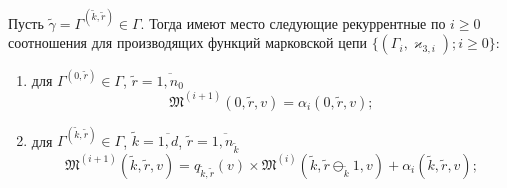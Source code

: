 \documentclass[a4paper,12pt,russian]{extarticle}
\newcommand{\MarkThree}{\{(\Gamma_i, \varkappa_{3,i}); i \geqslant 0\}}
\begin{document}
\begin{theorem}
Пусть $\tilde{\gamma}=\Gamma^{(\tilde{k},\tilde{r})} \in \Gamma$. Тогда имеют место следующие рекуррентные по $i \geqslant 0$ соотношения для производящих функций марковской цепи $\MarkThree$:
\begin{enumerate}

\item для $ \Gamma^{(0,\tilde{r})} \in \Gamma$, $\tilde{r} = \overline{1,n_0}$ 
$$
\mathfrak{M}^{(i+1)}(0,\tilde{r},v) = \alpha_i(0,\tilde{r},v);
$$
\item для $\Gamma^{(\tilde{k},\tilde{r})} \in \Gamma $, $\tilde{k} =\overline{1,d}$, $\tilde{r}=\overline{1,n_{\tilde{k}}}$
$$
\mathfrak{M}^{(i+1)}(\tilde{k},\tilde{r},v) = q_{\tilde{k},\tilde{r}} (v)\times  \mathfrak{M}^{(i)}(\tilde{k},\tilde{r} \ominus_{\tilde{k}} 1,v) + \alpha_i(\tilde{k},\tilde{r},v);
$$
\end{enumerate}

\label{theorem:gen:rek}
\end{theorem}
\end{document}
